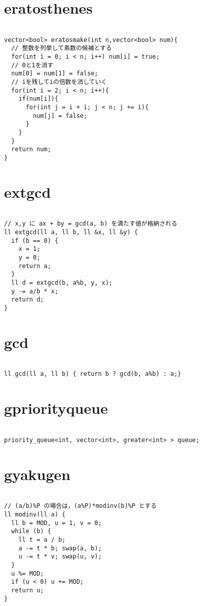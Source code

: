 \documentclass[a4j,titlepage]{jarticle} %
\begin{document}
\color{white}
\section{eratosthenes}
\color{black}
\begin{lstlisting}[caption=eratosthenes]

vector<bool> eratosmake(int n,vector<bool> num){
  // 整数を列挙して素数の候補とする
  for(int i = 0; i < n; i++) num[i] = true;
  // 0と1を消す
  num[0] = num[1] = false;
  // iを残してiの倍数を消していく
  for(int i = 2; i < n; i++){
    if(num[i]){
      for(int j = i + i; j < n; j += i){
        num[j] = false;
      }
    }
  }
  return num;
}

\end{lstlisting}

\color{white}
\section{extgcd}
\color{black}
\begin{lstlisting}[caption=extgcd]

// x,y に ax + by = gcd(a, b) を満たす値が格納される
ll extgcd(ll a, ll b, ll &x, ll &y) {
  if (b == 0) {
    x = 1;
    y = 0;
    return a;
  }
  ll d = extgcd(b, a%b, y, x);
  y -= a/b * x;
  return d;
}

\end{lstlisting}

\color{white}
\section{gcd}
\color{black}
\begin{lstlisting}[caption=gcd]

ll gcd(ll a, ll b) { return b ? gcd(b, a%b) : a;}

\end{lstlisting}

\color{white}
\section{gpriorityqueue}
\color{black}
\begin{lstlisting}[caption=gpriorityqueue]

priority_queue<int, vector<int>, greater<int> > queue;

\end{lstlisting}

\color{white}
\section{gyakugen}
\color{black}
\begin{lstlisting}[caption=gyakugen]

// (a/b)%P の場合は，(a%P)*modinv(b)%P とする
ll modinv(ll a) {
  ll b = MOD, u = 1, v = 0;
  while (b) {
    ll t = a / b;
    a -= t * b; swap(a, b);
    u -= t * v; swap(u, v);
  }
  u %= MOD;
  if (u < 0) u += MOD;
  return u;
}

\end{lstlisting}
\end{document}
